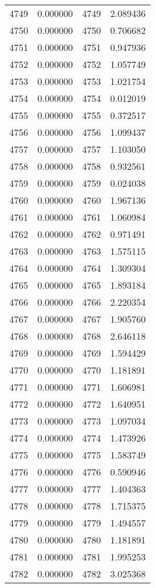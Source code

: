 \documentclass[12pt]{article}
\begin{document}
\begin{longtable}{@{}cccc@{}}
4749 & 0.000000 & 4749 & 2.089436 \\
4750 & 0.000000 & 4750 & 0.706682 \\
4751 & 0.000000 & 4751 & 0.947936 \\
4752 & 0.000000 & 4752 & 1.057749 \\
4753 & 0.000000 & 4753 & 1.021754 \\
4754 & 0.000000 & 4754 & 0.012019 \\
4755 & 0.000000 & 4755 & 0.372517 \\
4756 & 0.000000 & 4756 & 1.099437 \\
4757 & 0.000000 & 4757 & 1.103050 \\
4758 & 0.000000 & 4758 & 0.932561 \\
4759 & 0.000000 & 4759 & 0.024038 \\
4760 & 0.000000 & 4760 & 1.967136 \\
4761 & 0.000000 & 4761 & 1.060984 \\
4762 & 0.000000 & 4762 & 0.971491 \\
4763 & 0.000000 & 4763 & 1.575115 \\
4764 & 0.000000 & 4764 & 1.309304 \\
4765 & 0.000000 & 4765 & 1.893184 \\
4766 & 0.000000 & 4766 & 2.220354 \\
4767 & 0.000000 & 4767 & 1.905760 \\
4768 & 0.000000 & 4768 & 2.646118 \\
4769 & 0.000000 & 4769 & 1.594429 \\
4770 & 0.000000 & 4770 & 1.181891 \\
4771 & 0.000000 & 4771 & 1.606981 \\
4772 & 0.000000 & 4772 & 1.640951 \\
4773 & 0.000000 & 4773 & 1.097034 \\
4774 & 0.000000 & 4774 & 1.473926 \\
4775 & 0.000000 & 4775 & 1.583749 \\
4776 & 0.000000 & 4776 & 0.590946 \\
4777 & 0.000000 & 4777 & 1.404363 \\
4778 & 0.000000 & 4778 & 1.715375 \\
4779 & 0.000000 & 4779 & 1.494557 \\
4780 & 0.000000 & 4780 & 1.181891 \\
4781 & 0.000000 & 4781 & 1.995253 \\
4782 & 0.000000 & 4782 & 3.025368 \\

\end{longtable}
\end{document}
